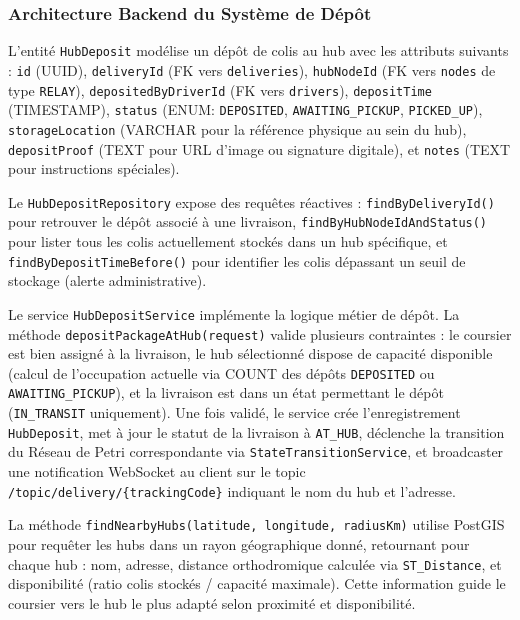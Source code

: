 \subsubsection{Architecture Backend du Système de Dépôt}

L'entité \texttt{HubDeposit} modélise un dépôt de colis au hub avec les attributs suivants : \texttt{id} (UUID), \texttt{deliveryId} (FK vers \texttt{deliveries}), \texttt{hubNodeId} (FK vers \texttt{nodes} de type \texttt{RELAY}), \texttt{depositedByDriverId} (FK vers \texttt{drivers}), \texttt{depositTime} (TIMESTAMP), \texttt{status} (ENUM: \texttt{DEPOSITED}, \texttt{AWAITING\_PICKUP}, \texttt{PICKED\_UP}), \texttt{storageLocation} (VARCHAR pour la référence physique au sein du hub), \texttt{depositProof} (TEXT pour URL d'image ou signature digitale), et \texttt{notes} (TEXT pour instructions spéciales).

Le \texttt{HubDepositRepository} expose des requêtes réactives : \texttt{findByDeliveryId()} pour retrouver le dépôt associé à une livraison, \texttt{findByHubNodeIdAndStatus()} pour lister tous les colis actuellement stockés dans un hub spécifique, et \texttt{findByDepositTimeBefore()} pour identifier les colis dépassant un seuil de stockage (alerte administrative).

Le service \texttt{HubDepositService} implémente la logique métier de dépôt. La méthode \texttt{depositPackageAtHub(request)} valide plusieurs contraintes : le coursier est bien assigné à la livraison, le hub sélectionné dispose de capacité disponible (calcul de l'occupation actuelle via COUNT des dépôts \texttt{DEPOSITED} ou \texttt{AWAITING\_PICKUP}), et la livraison est dans un état permettant le dépôt (\texttt{IN\_TRANSIT} uniquement). Une fois validé, le service crée l'enregistrement \texttt{HubDeposit}, met à jour le statut de la livraison à \texttt{AT\_HUB}, déclenche la transition du Réseau de Petri correspondante via \texttt{StateTransitionService}, et broadcaster une notification WebSocket au client sur le topic \texttt{/topic/delivery/\{trackingCode\}} indiquant le nom du hub et l'adresse.

La méthode \texttt{findNearbyHubs(latitude, longitude, radiusKm)} utilise PostGIS pour requêter les hubs dans un rayon géographique donné, retournant pour chaque hub : nom, adresse, distance orthodromique calculée via \texttt{ST\_Distance}, et disponibilité (ratio colis stockés / capacité maximale). Cette information guide le coursier vers le hub le plus adapté selon proximité et disponibilité.

